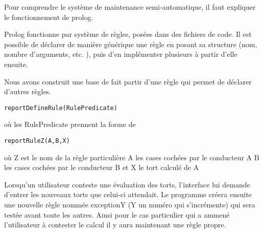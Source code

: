
Pour comprendre le système de maintenance semi-automatique, il faut expliquer le fonctionnement de prolog.

Prolog fonctionne par système de règles, posées dans des fichiers de code. Il est possible de déclarer de manière générique une règle en posant sa structure (nom, nombre d'arguments, etc. ), puis d'en implémenter plusieurs à partir d'elle ensuite.

Nous avons construit une base de fait  partir d'une règle qui permet de déclarer d'autres règles.

\begin{lstlisting}[frame=single]
reportDefineRule(RulePredicate)
\end{lstlisting}

où les RulePredicate prennent la forme de 

\begin{lstlisting}[frame=single]
reportRuleZ(A,B,X) 
\end{lstlisting}

où Z est le nom de la règle particulière 
\newline
A les cases cochées par le conducteur A
\newline
B les cases cochées par le conducteur B
\newline
et X le tort calculé de A
\newline

Lorsqu'un utilisateur conteste une évaluation des torts, l'interface lui demande d'entrer les nouveaux torts que celui-ci attendait. Le programme créera ensuite une nouvelle règle nommée exceptionY (Y un numéro qui s'incrémente) qui sera testée avant toute les autres. Ainsi pour le cas particulier qui a ammené l'utilisateur à contester le calcul il y aura maintenant une règle propre. 


